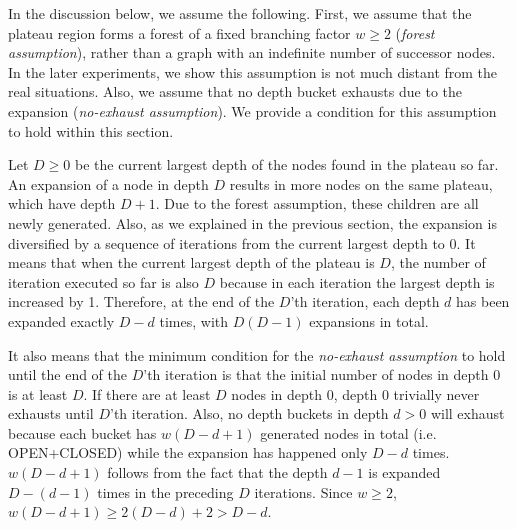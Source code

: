 
% 
In the discussion below, we assume the following.
First, we assume that the plateau region forms a forest of a fixed branching factor
$w\geq 2$ (\emph{forest assumption}), rather than a graph with an indefinite number of successor nodes.
In the later experiments, we show this assumption is not much distant from the real situations.
Also, we assume that no depth bucket exhausts due to the expansion (\emph{no-exhaust assumption}).
We provide a condition for this assumption to hold within this section.

Let $D\geq 0$ be the current largest depth of the nodes found in the plateau so far. An expansion of a node in
depth $D$ results in more nodes on the same plateau, which have depth $D+1$.  Due to the forest
assumption, these children are all newly generated. Also, as we explained in the previous section, the expansion is
diversified by a sequence of iterations from the current largest depth to 0.  It means that when the current
largest depth of the plateau is $D$, the number of iteration executed so far is also $D$ because
in each iteration the largest depth is increased by 1.
Therefore, at the end of the $D$'th iteration, each depth $d$ has been expanded exactly $D-d$ times, with $D(D-1)$
expansions in total.

It also means that the minimum condition for the \emph{no-exhaust assumption} to hold until the end of the $D$'th
iteration is that the initial number of nodes in depth 0 is at least $D$.  If there are at least $D$ nodes in depth
0, depth 0 trivially never exhausts until $D$'th iteration. Also, no depth buckets in depth $d>0$ will exhaust
because each bucket has $w(D-d+1)$ generated nodes in total (i.e. OPEN+CLOSED) while the expansion has
happened only $D-d$ times.
$w(D-d+1)$ follows from the fact that the depth $d-1$ is expanded $D-(d-1)$ times in the preceding $D$ iterations.
Since $w\geq 2$, $w(D-d+1)\geq 2(D-d)+2>D-d$.

